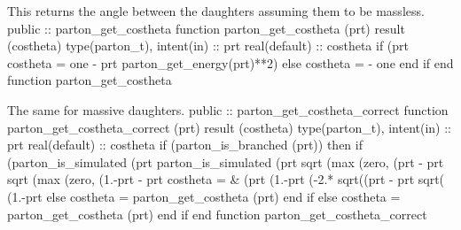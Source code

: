 \nwendcode{} %
\nwenddocs{}This returns the angle between the daughters assuming them to be
massless.
\nwenddocs{}\plusendmoddef
  public :: parton_get_costheta
\nwendcode{}\plusendmoddef
  function parton_get_costheta (prt) result (costheta)
    type(parton_t), intent(in) :: prt
    real(default) :: costheta
    if (prt%
       costheta = one - prt%
            parton_get_energy(prt)**2)
    else
       costheta = - one
    end if
  end function parton_get_costheta

\eatline
\nwendcode{}The same for massive daughters.
\nwenddocs{}\plusendmoddef
  public :: parton_get_costheta_correct
\nwendcode{}\nwdocspar
\nwenddocs{}\plusendmoddef
  function parton_get_costheta_correct (prt) result (costheta)
    type(parton_t), intent(in) :: prt
    real(default) :: costheta
    if (parton_is_branched (prt)) then
       if (parton_is_simulated (prt%
            parton_is_simulated (prt%
            sqrt (max (zero, (prt%
                                        - prt%
            sqrt (max (zero, (1.-prt%
                                         - prt%
          costheta = &
               (prt%
               (1.-prt%
               (-2.* sqrt((prt%
               - prt%
               sqrt( (1.-prt%
       else
          costheta = parton_get_costheta (prt)
       end if
    else
       costheta = parton_get_costheta (prt)
    end if
  end function parton_get_costheta_correct

